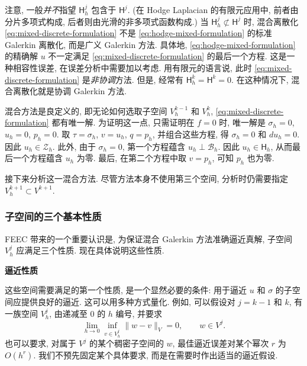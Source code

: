 {注意, 一般\emph{并不}指望 $\mathsf H_h^j$ 包含于 $\mathsf H^j$. (在 Hodge Laplacian 的有限元应用中, 前者由分片多项式构成, 后者则由光滑的非多项式函数构成.) 当 $\mathsf H_h^j\not\subset\mathsf H^j$ 时, 混合离散化 \eqref{eq:mixed-discrete-formulation} 不是 \eqref{eq:hodge-mixed-formulation} 的标准 Galerkin 离散化, 而是广义 Galerkin 方法. 具体地, \eqref{eq:hodge-mixed-formulation} 的精确解 $u$ 不一定满足 \eqref{eq:mixed-discrete-formulation} 的最后一个方程. 这是一种相容性误差, 在误差分析中需要加以考虑. 用有限元的语言说, 此时 \eqref{eq:mixed-discrete-formulation} 是\emph{非协调}方法. 但是, 经常有 $\mathsf H_h^k=\mathsf H^k=0$. 在这种情况下, 混合离散化就是协调 Galerkin 方法.}

{混合方法是良定义的, 即无论如何选取子空间 $V_h^{k-1}$ 和 $V_h^k$, \eqref{eq:mixed-discrete-formulation} 都有唯一解. 为证明这一点, 只需证明在 $f=0$ 时, 唯一解是 $\sigma_h=0$, $u_h=0$, $p_h=0$. 取 $\tau=\sigma_h$, $v=u_h$, $q=p_h$, 并组合这些方程, 得 $\sigma_h=0$ 和 $du_h=0$. 因此 $u_h\in\mathcal Z_h$. 此外, 由于 $\sigma_h=0$, 第一个方程蕴含 $u_h\perp\mathcal B_h$. 因此 $u_h\in\mathsf H_h$, 从而最后一个方程蕴含 $u_h$ 为零. 最后, 在第二个方程中取 $v=p_h$, 可知 $p_h$ 也为零.}

{接下来分析这一混合方法. 尽管方法本身不使用第三个空间, 分析时仍需要指定 $V_h^{k+1}\subset V^{k+1}$.}

\subsubsection{{子空间的三个基本性质}}\label{subsec:mixed-three-properties}

{FEEC 带来的一个重要认识是, 为保证混合 Galerkin 方法准确逼近真解, 子空间 $V_h^j$ 应满足三个性质. 现在具体说明这些性质.}

\medskip\noindent\textbf{{逼近性质}}\par
{这些空间需要满足的第一个性质, 是一个显然必要的条件: 用于逼近 $u$ 和 $\sigma$ 的子空间应提供良好的逼近. 这可以用多种方式量化. 例如, 可以假设对 $j=k-1$ 和 $k$, 有一族空间 $V_h^j$, 由递减至 $0$ 的 $h$ 编号, 并要求}
\begin{equation}\label{eq:galerkin-approximation-property}
\lim_{h\to0}\inf_{v\in V_h^j}\|w-v\|_V=0,\qquad w\in V^j.
\end{equation}
{也可以要求, 对属于 $V^j$ 的某个稠密子空间的 $w$, 最佳逼近误差对某个幂次 $r$ 为 $O(h^r)$. 我们不预先固定某个具体要求, 而是在需要时作出适当的逼近假设.}


